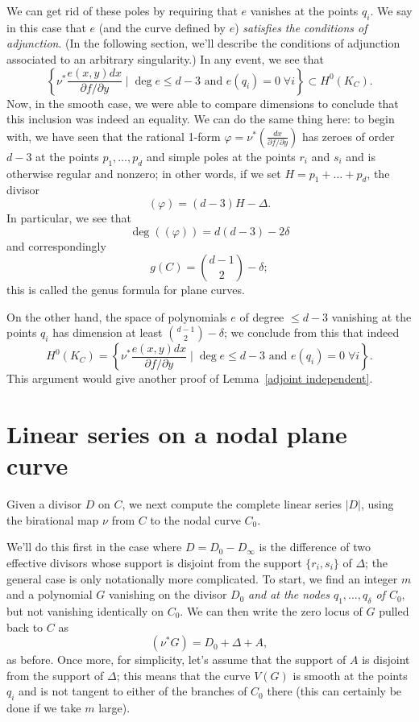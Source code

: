 We can get rid of these poles by requiring that $e$ vanishes at the points $q_i$. We say in this case that $e$ (and the curve defined by $e$) \emph{satisfies the conditions of adjunction}. (In the following section, we'll describe the  conditions of adjunction associated to an arbitrary singularity.) In any event, we see that
$$
 \left\{ \nu^* \frac{e(x,y)dx}{\partial f/\partial y} \mid \deg e \leq d-3 \text{ and } e(q_i) = 0 \; \forall i \right\} \subset H^0(K_C).
$$
Now, in the smooth case, we were able to compare dimensions to conclude that this inclusion was indeed an equality. We can do the same thing here: to begin with, we have seen that the  rational 1-form $\varphi = \nu^*(\frac{dx}{\partial f/\partial y})$ has zeroes of order $d-3$ at the points $p_1,\dots,p_d$ and simple poles at the points $r_i$ and $s_i$ and is otherwise regular and nonzero; in other words, if we set $H = p_1+\dots + p_d$, the divisor
$$
(\varphi) = (d-3)H - \Delta.
$$
In particular, we see that
$$
\deg((\varphi)) = d(d-3) - 2\delta
$$
and correspondingly
$$
g(C) = \binom{d-1}{2} - \delta;
$$
this is called the genus formula for plane curves.

On the other hand, the space of polynomials $e$ of degree $\leq d-3$ vanishing at the points $q_i$ has dimension at least $ \binom{d-1}{2} - \delta$; we conclude from this that indeed
$$
H^0(K_C) =  \left\{ \nu^* \frac{e(x,y)dx}{\partial f/\partial y} \mid \deg e \leq d-3 \text{ and } e(q_i) = 0 \; \forall i \right\}.
$$
This argument would give another proof of Lemma~\ref{adjoint independent}.


\section{Linear series on a nodal plane curve}\label{linear series on nodal plane curves}

Given a divisor $D$ on $C$, we next compute the complete linear series $|D|$, using the birational map $\nu$ from 
$C$ to the nodal curve $C_0$.

We'll do this first in the case where $D = D_0-D_\infty$ is the difference of two effective divisors whose support is disjoint from the support $\{r_i, s_i\}$ of $\Delta$; the general case is only notationally more complicated. To start, we find an integer $m$ and a polynomial $G$ vanishing on the divisor $D_0$ \emph{and at the nodes $q_1,\dots,q_\delta$ of $C_0$}, but not vanishing identically on $C_0$. We can then write the zero locus of $G$ pulled back to $C$ as
$$
(\nu^*G) = D_0 + \Delta + A,
$$
as before. Once more, 
 for simplicity, let's assume that the support of $A$ is disjoint from the support of $\Delta$; this means 
  that the curve $V(G)$ is smooth at the points $q_i$ and is not tangent to either of the branches of $C_0$ there (this can certainly be done if we take $m$ large).

